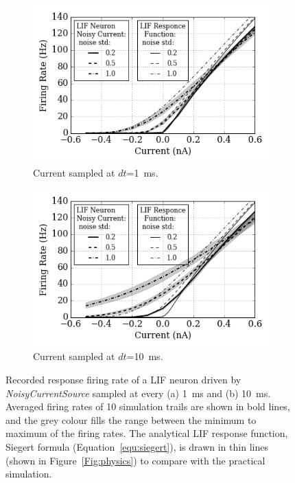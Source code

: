 	
	\begin{figure}[tbp!]
		\centering
		\begin{subfigure}[t]{0.49\textwidth}
			\includegraphics[width=\textwidth]{pics_iconip/2-1.png}
			\caption{Current sampled at $dt$=1~ms.}
		\end{subfigure}
		\begin{subfigure}[t]{0.49\textwidth}
			\includegraphics[width=\textwidth]{pics_iconip/2-10.png}
			\caption{Current sampled at $dt$=10~ms.}
		\end{subfigure}
		\caption{Recorded response firing rate of a LIF neuron driven by \textit{NoisyCurrentSource} sampled at every (a) 1~ms and (b) 10~ms. Averaged firing rates of 10 simulation trails are shown in bold lines, and the grey colour fills the range between the minimum to maximum of the firing rates. The analytical LIF response function, Siegert formula (Equation~\ref{equ:siegert}), is drawn in thin lines (shown in Figure~\ref{Fig:physics}) to compare with the practical simulation.}
		\label{Fig:current}
	\end{figure}
		
